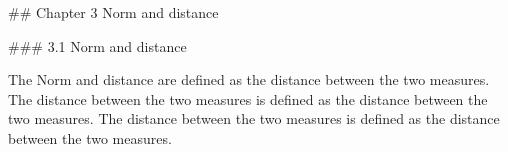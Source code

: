 

## Chapter 3 Norm and distance

### 3.1 Norm and distance

The Norm and distance are defined as the distance between the two measures. The distance between the two measures is defined as the distance between the two measures. The distance between the two measures is defined as the distance between the two measures.

